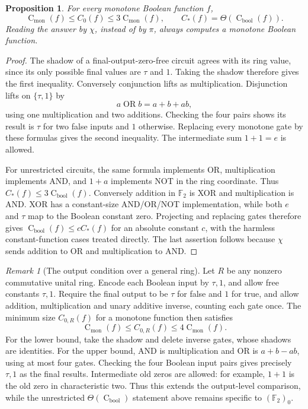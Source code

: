 \documentclass[11pt]{article}
\newcommand{\F}{\mathbb F}
\newcommand{\cmon}{\operatorname{C}_{\mathrm{mon}}}
\newcommand{\cbool}{\operatorname{C}_{\mathrm{bool}}}
\newtheorem{proposition}[theorem]{Proposition}
\theoremstyle{definition}
\theoremstyle{remark}
\newtheorem{remark}[theorem]{Remark}
\begin{document}
\begin{proposition}\label{prop:complexity}
For every monotone Boolean function $f$,
\[
 \cmon(f)\le C_0(f)\le3\cmon(f),
 \qquad
 C_*(f)=\Theta(\cbool(f)).
\]
Reading the answer by $\chi$, instead of by $\pi$, always computes a monotone Boolean function.
\end{proposition}
\begin{proof}
The shadow of a final-output-zero-free circuit agrees with its ring value, since its only possible final values are $\tau$ and $1$. Taking the shadow therefore gives the first inequality. Conversely conjunction lifts as multiplication. Disjunction lifts on $\{\tau,1\}$ by
\[
 a\mathbin{\operatorname{OR}}b=a+b+ab,
\]
using one multiplication and two additions. Checking the four pairs shows its result is $\tau$ for two false inputs and $1$ otherwise. Replacing every monotone gate by these formulas gives the second inequality. The intermediate sum $1+1=e$ is allowed.

For unrestricted circuits, the same formula implements OR, multiplication implements AND, and $1+a$ implements NOT in the ring coordinate. Thus $C_*(f)\le3\cbool(f)$. Conversely addition in $\F_2$ is XOR and multiplication is AND. XOR has a constant-size AND/OR/NOT implementation, while both $e$ and $\tau$ map to the Boolean constant zero. Projecting and replacing gates therefore gives $\cbool(f)\le cC_*(f)$ for an absolute constant $c$, with the harmless constant-function cases treated directly. The last assertion follows because $\chi$ sends addition to OR and multiplication to AND.
\end{proof}

\begin{remark}[The output condition over a general ring]\label{rem:generalring}
Let $R$ be any nonzero commutative unital ring. Encode each Boolean input by $\tau,1$, and allow free constants $\tau,1$. Require the final output to be $\tau$ for false and $1$ for true, and allow addition, multiplication and unary additive inverse, counting each gate once. The minimum size $C_{0,R}(f)$ for a monotone function then satisfies
\[
 \cmon(f)\le C_{0,R}(f)\le4\cmon(f).
\]
For the lower bound, take the shadow and delete inverse gates, whose shadows are identities. For the upper bound, AND is multiplication and OR is $a+b-ab$, using at most four gates. Checking the four Boolean input pairs gives precisely $\tau,1$ as the final results. Intermediate old zeros are allowed: for example, $1+1$ is the old zero in characteristic two. Thus this extends the output-level comparison, while the unrestricted $\Theta(\cbool)$ statement above remains specific to $(\F_2)_0$.
\end{remark}
\end{document}
